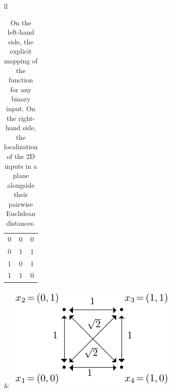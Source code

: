 \documentclass[12pt]{report} %
\newcommand{\tmverbatim}[1]{\text{{\ttfamily{#1}}}}
\begin{document}

\begin{table}[h]
  \begin{tabular}{ll}
    \frame
    {\begin{tabular}{|c|c|c|}
      \hline
      \tmverbatim{A} & \tmverbatim{B} & \tmverbatim{xor(A,B)}\\
      \hline
      0 & 0 & 0\\
      \hline
      0 & 1 & 1\\
      \hline
      1 & 0 & 1\\
      \hline
      1 & 1 & 0\\
      \hline
    \end{tabular}} &
    {\includegraphics[width=.41\textwidth]{imagenes/rbf_discussion/drawing-xor.pdf}}
  \end{tabular}
  \caption{On the left-hand side, the explicit mapping of the \tmverbatim{xor}
  function for any binary input. On the right-hand side, the localization of
  the 2D inputs in a plane alongside their pairwise Euclidean distances.
  }
  \label{table-xor-distances}
\end{table}
\end{document}
